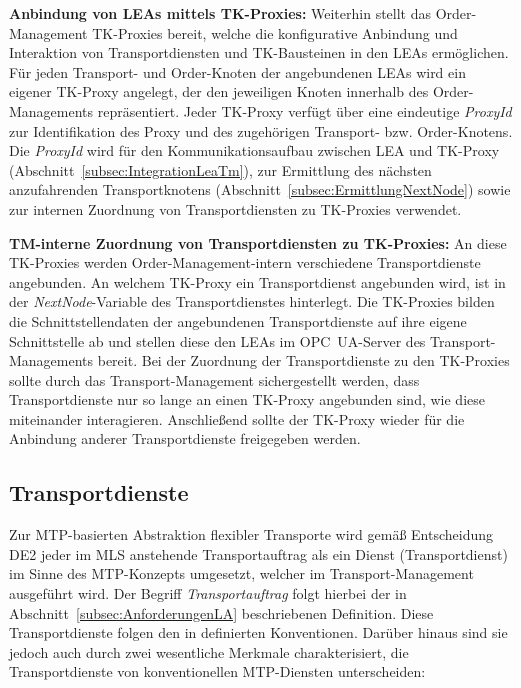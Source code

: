 \textbf{Anbindung von LEAs mittels TK-Proxies:} Weiterhin stellt das Order-Management TK-Proxies bereit, welche die konfigurative Anbindung und Interaktion von Transportdiensten und TK-Bausteinen in den LEAs ermöglichen. Für jeden Transport- und Order-Knoten der angebundenen LEAs wird ein eigener TK-Proxy angelegt, der den jeweiligen Knoten innerhalb des Order-Managements repräsentiert. Jeder TK-Proxy verfügt über eine eindeutige \emph{ProxyId} zur Identifikation des Proxy und des zugehörigen Transport- bzw. Order-Knotens. Die \emph{ProxyId} wird für den Kommunikationsaufbau zwischen LEA und TK-Proxy (Abschnitt~\ref{subsec:IntegrationLeaTm}), zur Ermittlung des nächsten anzufahrenden Transportknotens (Abschnitt~\ref{subsec:ErmittlungNextNode}) sowie zur internen Zuordnung von Transportdiensten zu TK-Proxies verwendet.

\textbf{TM-interne Zuordnung von Transportdiensten zu TK-Proxies:} An diese TK-Proxies werden Order-Management-intern verschiedene Transportdienste angebunden. An welchem TK-Proxy ein Transportdienst angebunden wird, ist in der \emph{NextNode}-Variable des Transportdienstes hinterlegt. Die TK-Proxies bilden die Schnittstellendaten der angebundenen Transportdienste auf ihre eigene Schnittstelle ab und stellen diese den LEAs im OPC~UA-Server des Transport-Managements bereit. Bei der Zuordnung der Transportdienste zu den TK-Proxies sollte durch das Transport-Management sichergestellt werden, dass Transportdienste nur so lange an einen TK-Proxy angebunden sind, wie diese miteinander interagieren. Anschließend sollte der TK-Proxy wieder für die Anbindung anderer Transportdienste freigegeben werden.

\subsection{Transportdienste}
\label{subsec:CharakteristikTransportdienste}

Zur MTP-basierten Abstraktion flexibler Transporte wird gemäß Entscheidung DE2 jeder im MLS anstehende Transportauftrag als ein Dienst (Transportdienst) im Sinne des MTP-Konzepts umgesetzt, welcher im Transport-Management ausgeführt wird. Der Begriff \emph{Transportauftrag} folgt hierbei der in Abschnitt~\ref{subsec:AnforderungenLA} beschriebenen Definition. Diese Transportdienste folgen den in \cite{PNO.2025.Part4} definierten Konventionen. Darüber hinaus sind sie jedoch auch durch zwei wesentliche Merkmale charakterisiert, die Transportdienste von konventionellen MTP-Diensten unterscheiden:

